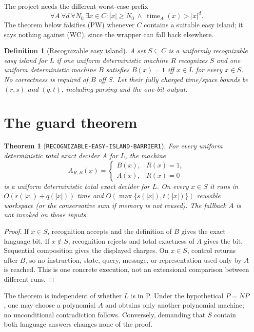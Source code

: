 \documentclass[11pt]{article}
\newtheorem{definition}{Definition}
\newtheorem{theorem}{Theorem}
\begin{document}
The project needs the different worst-case prefix
\begin{equation}
 \forall A\ \forall d\ \forall N_0\ \exists x\in C:
 |x|\ge N_0\ \land\ \operatorname{time}_{A}(x)>|x|^d.
 \tag{WC}
\end{equation}
The theorem below falsifies (PW) whenever $C$ contains a suitable easy island;
it says nothing against (WC), since the wrapper can fall back elsewhere.

\begin{definition}[Recognizable easy island]
A set $S\subseteq C$ is a uniformly recognizable easy island for $L$ if one
uniform deterministic machine $R$ recognizes $S$ and one uniform deterministic
machine $B$ satisfies $B(x)=1$ iff $x\in L$ for every $x\in S$.  No correctness
is required of $B$ off $S$.  Let their fully charged time/space bounds be
$(r,s)$ and $(q,t)$, including parsing and the one-bit output.
\end{definition}

\section{The guard theorem}

\begin{theorem}[\texttt{RECOGNIZABLE-EASY-ISLAND-BARRIER1}]
For every uniform deterministic total exact decider $A$ for $L$, the machine
\[
 A_{R,B}(x)=
 \begin{cases}
 B(x),&R(x)=1,\\
 A(x),&R(x)=0
 \end{cases}
 \tag{1}
\]
is a uniform deterministic total exact decider for $L$.  On every $x\in S$ it
runs in $O(r(|x|)+q(|x|))$ time and
$O(\max\{s(|x|),t(|x|)\})$ reusable workspace (or the conservative sum if
memory is not reused).  The fallback $A$ is not invoked on those inputs.
\end{theorem}

\begin{proof}
If $x\in S$, recognition accepts and the definition of $B$ gives the exact
language bit.  If $x\notin S$, recognition rejects and total exactness of $A$
gives the bit.  Sequential composition gives the displayed charges.  On
$x\in S$, control returns after $B$, so no instruction, state, query, message,
or representation used only by $A$ is reached.  This is one concrete execution,
not an extensional comparison between different runs.
\end{proof}

The theorem is independent of whether $L$ is in P.  Under the hypothetical
$P=NP$, one may choose a polynomial $A$ and obtains only another polynomial
machine; no unconditional contradiction follows.  Conversely, demanding that
$S$ contain both language answers changes none of the proof.
\end{document}
